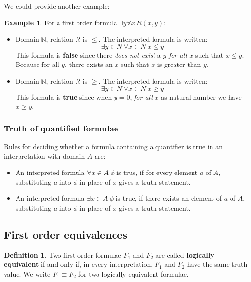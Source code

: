 \documentclass[11pt]{article}
\theoremstyle{definition}
\newtheorem{defn}{Definition}[subsection]
\newtheorem{eg}{Example}[subsection]
\begin{document}
We could provide another example:
\begin{eg}
    For a first order formula $\exists y \forall x \: R(x,y)$:
    \begin{itemize}
        \item Domain $\mathbb{N}$, relation $R$ is $\leq$. The interpreted formula is written: \begin{equation}
            \exists y \in N \: \forall x \in N \: x \leq y
        \end{equation}
        This formula is \textbf{false} since there \textit{does not exist} a $y$ \textit{for all} $x$ such that $x \leq y$. Because for all $y$, there exists an $x$ such that $x$ is greater than $y$.
        \item Domain $\mathbb{N}$, relation $R$ is $\geq$. The interpreted formula is written: \begin{equation}
            \exists y \in N \: \forall x \in N \: x \geq y
        \end{equation}
        This formula is \textbf{true} since when $y=0$, \textit{for all} $x$ as natural number we have $x \geq y$.
    \end{itemize}
\end{eg}

\subsubsection{Truth of quantified formulae}
Rules for deciding whether a formula containing a quantifier is true in an interpretation with domain $A$ are:
\begin{itemize}
    \item An interpreted formula $\forall x \in A \: \phi$ is true, if for every element $a$ of $A$, substituting $a$ into $\phi$ in place of $x$ gives a truth statement.
    \item An interpreted formula $\exists x \in A \: \phi$ is true, if there exists an element of $a$ of $A$, substituting $a$ into $\phi$ in place of $x$ gives a truth statement.
\end{itemize}

\subsection{First order equivalences}
\begin{shaded}
    \begin{defn}
        Two first order formulae $F_1$ and $F_2$ are called \textbf{logically equivalent} if and only if, in every interpretation, $F_1$ and $F_2$ have the same truth value. We write $F_1 \equiv F_2$ for two logically equivalent formulae.
    \end{defn}
\end{shaded}
\end{document}
